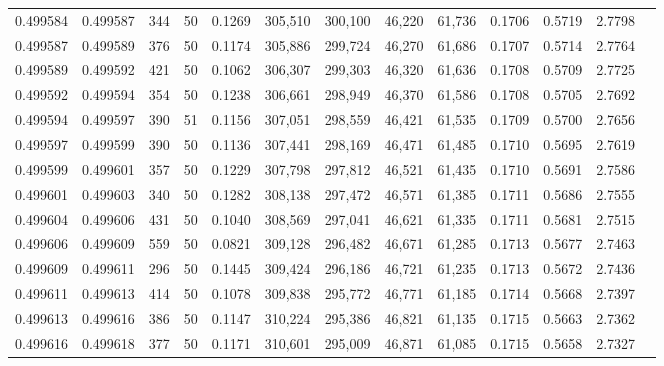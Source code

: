 \begin{tabular}{rrrrrrrrrrrrr}
0.499584 & 0.499587 & 344 &  50 &                                     0.1269 & 305,510 & 300,100 &  46,220 &  61,736 & 0.1706 & 0.5719 & 2.7798 \\
0.499587 & 0.499589 & 376 &  50 &                                     0.1174 & 305,886 & 299,724 &  46,270 &  61,686 & 0.1707 & 0.5714 & 2.7764 \\
0.499589 & 0.499592 & 421 &  50 &                                     0.1062 & 306,307 & 299,303 &  46,320 &  61,636 & 0.1708 & 0.5709 & 2.7725 \\
0.499592 & 0.499594 & 354 &  50 &                                     0.1238 & 306,661 & 298,949 &  46,370 &  61,586 & 0.1708 & 0.5705 & 2.7692 \\
0.499594 & 0.499597 & 390 &  51 &                                     0.1156 & 307,051 & 298,559 &  46,421 &  61,535 & 0.1709 & 0.5700 & 2.7656 \\
0.499597 & 0.499599 & 390 &  50 &                                     0.1136 & 307,441 & 298,169 &  46,471 &  61,485 & 0.1710 & 0.5695 & 2.7619 \\
0.499599 & 0.499601 & 357 &  50 &                                     0.1229 & 307,798 & 297,812 &  46,521 &  61,435 & 0.1710 & 0.5691 & 2.7586 \\
0.499601 & 0.499603 & 340 &  50 &                                     0.1282 & 308,138 & 297,472 &  46,571 &  61,385 & 0.1711 & 0.5686 & 2.7555 \\
0.499604 & 0.499606 & 431 &  50 &                                     0.1040 & 308,569 & 297,041 &  46,621 &  61,335 & 0.1711 & 0.5681 & 2.7515 \\
0.499606 & 0.499609 & 559 &  50 &                                     0.0821 & 309,128 & 296,482 &  46,671 &  61,285 & 0.1713 & 0.5677 & 2.7463 \\
0.499609 & 0.499611 & 296 &  50 &                                     0.1445 & 309,424 & 296,186 &  46,721 &  61,235 & 0.1713 & 0.5672 & 2.7436 \\
0.499611 & 0.499613 & 414 &  50 &                                     0.1078 & 309,838 & 295,772 &  46,771 &  61,185 & 0.1714 & 0.5668 & 2.7397 \\
0.499613 & 0.499616 & 386 &  50 &                                     0.1147 & 310,224 & 295,386 &  46,821 &  61,135 & 0.1715 & 0.5663 & 2.7362 \\
0.499616 & 0.499618 & 377 &  50 &                                     0.1171 & 310,601 & 295,009 &  46,871 &  61,085 & 0.1715 & 0.5658 & 2.7327 \\

\end{tabular}
